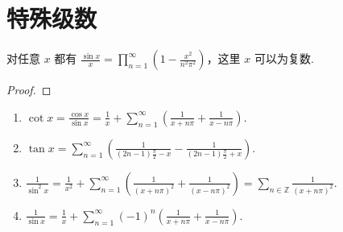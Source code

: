 \documentclass[../../main.tex]{subfiles}%
\begin{document}
\section{特殊级数}

\begin{proposition}\label{proposition:sinx/x因式分解}
对任意 $x$ 都有 $\frac{\sin x}{x} = \prod_{n=1}^{\infty} \left(1 - \frac{x^2}{n^2\pi^2}\right)$，这里 $x$ 可以为复数.
\end{proposition}
\begin{proof}



\end{proof}

\begin{proposition}\label{proposition:三角函数的特殊级数表示}
\begin{enumerate}
\item $\cot x = \frac{\cos x}{\sin x} = \frac{1}{x} + \sum_{n=1}^{\infty} \left( \frac{1}{x + n\pi} + \frac{1}{x - n\pi} \right).$

\item $\tan x = \sum_{n=1}^{\infty} \left( \frac{1}{(2n - 1)\frac{\pi}{2} - x} - \frac{1}{(2n - 1)\frac{\pi}{2} + x} \right) .$

\item $\frac{1}{\sin^2 x} = \frac{1}{x^2} + \sum_{n=1}^{\infty} \left( \frac{1}{(x + n\pi)^2} + \frac{1}{(x - n\pi)^2} \right) = \sum_{n \in \mathbb{Z}} \frac{1}{(x + n\pi)^2}.$

\item $\frac{1}{\sin x} = \frac{1}{x} + \sum_{n=1}^{\infty} (-1)^n \left( \frac{1}{x + n\pi} + \frac{1}{x - n\pi} \right).$
\end{enumerate}
\end{proposition}
\end{document}
